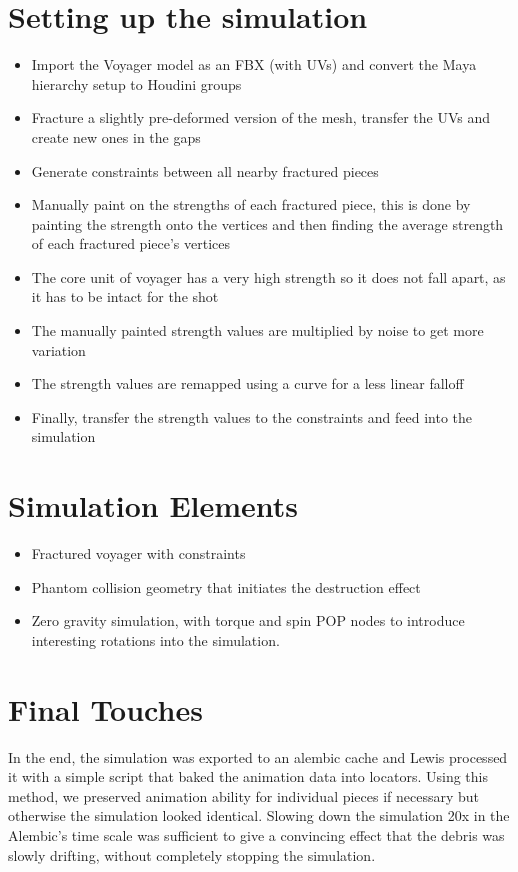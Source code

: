 \documentclass[11pt,a4paper,final,notitlepage]{report}
\begin{document}
\section{Setting up the simulation}
\begin{itemize}
	\item Import the Voyager model as an FBX (with UVs) and convert the Maya hierarchy setup to Houdini groups
	\item Fracture a slightly pre-deformed version of the mesh, transfer the UVs and create new ones in the gaps
	\item Generate constraints between all nearby fractured pieces
	\item Manually paint on the strengths of each fractured piece, this is done by painting the strength onto the vertices and then finding the average strength of each fractured piece's vertices
	\item The core unit of voyager has a very high strength so it does not fall apart, as it has to be intact for the shot
	\item The manually painted strength values are multiplied by noise to get more variation
	\item The strength values are remapped using a curve for a less linear falloff
	\item Finally, transfer the strength values to the constraints and feed into the simulation
\end{itemize}

\section{Simulation Elements}
\begin{itemize}
	\item Fractured voyager with constraints
	\item Phantom collision geometry that initiates the destruction effect
	\item Zero gravity simulation, with torque and spin POP nodes to introduce interesting rotations into the simulation.
\end{itemize}

\section{Final Touches}
In the end, the simulation was exported to an alembic cache and Lewis processed it with a simple script that baked the animation data into locators. Using this method, we preserved animation ability for individual pieces if necessary but otherwise the simulation looked identical. Slowing down the simulation 20x in the Alembic's time scale was sufficient to give a convincing effect that the debris was slowly drifting, without completely stopping the simulation.
\end{document}
